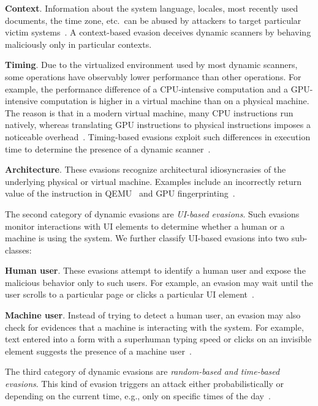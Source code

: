 \textbf{Context}.
    Information about the system language, locales, most recently used 
    documents, the time zone, etc.\ can be abused by attackers to target 
    particular victim systems~\cite{le2017broad, rasthofer2017making}.
    A context-based evasion deceives dynamic scanners by behaving 
    maliciously only in particular contexts.

\textbf{Timing}.
    Due to the virtualized environment used by most dynamic scanners, some 
    operations have observably lower performance than other operations.
    For example, the performance difference of a CPU-intensive computation
    and a GPU-intensive computation is higher in a virtual machine than on a 
    physical machine.
    The reason is that in a modern virtual machine, many CPU instructions 
    run natively, whereas translating GPU instructions to physical 
    instructions imposes a noticeable overhead~\cite{ho2014tick}.
    Timing-based evasions exploit such differences in execution time to 
    determine the presence of a dynamic scanner~\cite{timing_evasion}.
    
\textbf{Architecture}.
  These  evasions recognize architectural idiosyncrasies of the 
    underlying physical or virtual machine.
    Examples include an incorrectly return value of the  instruction in
    QEMU~\cite{ferrie2007attacks} and GPU fingerprinting~\cite{gpufingerprinting}.

\medskip
The second category of dynamic evasions are \emph{UI-based evasions}.
Such evasions monitor interactions with UI elements to determine whether a 
human or a machine is using the system.
We further classify UI-based evasions into two sub-classes:

\textbf{Human user}.
    These evasions attempt to identify a human user and expose the 
    malicious behavior only to such users.
    For example, an evasion may wait until the user scrolls to a 
    particular page or clicks a particular UI 
    element~\cite{userinteraction}.

\textbf{Machine user}.
    Instead of trying to detect a human user, an evasion may also check for 
    evidences that a machine is interacting with the system.
    For example, text entered into a form with a superhuman 
    typing speed or clicks on an invisible element suggests the presence of a machine 
    user~\cite{keragala2016detecting}.

\medskip
The third category of dynamic evasions are \emph{random-based and time-based 
evasions}.
This kind of evasion triggers an attack either probabilistically or 
depending on the current time, e.g., only on specific times of the 
day~\cite{timebased}.



